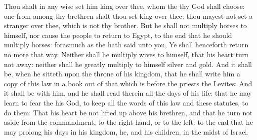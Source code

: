\begin{biblechapter}
\verse Thou shalt in any wise set him king over thee, whom the \LORD thy God shall choose: one from among thy brethren shalt thou set king over thee: thou mayest not set a stranger over thee, which is not thy brother.
\verse But he shall not multiply horses to himself, nor cause the people to return to Egypt, to the end that he should multiply horses: forasmuch as the \LORD hath said unto you, Ye shall henceforth return no more that way.
\verse Neither shall he multiply wives to himself, that his heart turn not away: neither shall he greatly multiply to himself silver and gold.
\verse And it shall be, when he sitteth upon the throne of his kingdom, that he shall write him a copy of this law in a book out of that which is before the priests the Levites:
\verse And it shall be with him, and he shall read therein all the days of his life: that he may learn to fear the \LORD his God, to keep all the words of this law and these statutes, to do them:
\verse That his heart be not lifted up above his brethren, and that he turn not aside from the commandment, to the right hand, or to the left: to the end that he may prolong his days in his kingdom, he, and his children, in the midst of Israel.
\end{biblechapter}

